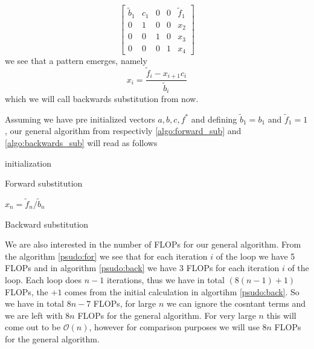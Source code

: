 \documentclass[10pt, a4paper]{amsart}
\begin{document}
\begin{equation}
\left[
  \begin{array}{cccc|c}
	\tilde{b}_1 & c_1 & 0 & 0 & \tilde{f}_1\\
	0 & 1 & 0 & 0 & x_2\\
	0 & 0 & 1 & 0 & x_3\\
	0 & 0 & 0 & 1 & x_4
  \end{array}
 \right]
\end{equation}
we see that a pattern emerges, namely
\begin{equation}\label{algo:backwards_sub}
	x_i = \frac{\tilde{f}_i - x_{i+1}c_i}{\tilde{b}_i}
\end{equation}
which we will call backwards substitution from now. 

Assuming we have pre initialized vectors $a, b, c, f^*$ and defining $\tilde{b}_1 = b_1$ and $\tilde{f}_1 = 1$, our general algorithm from respectivly \ref{algo:forward_sub} and \ref{algo:backwards_sub} will read as follows
\begin{algorithm}[H]\label{psudo:for}
\SetAlgoLined
 initialization\;
\caption{Forward substitution}
\end{algorithm}
\begin{algorithm}[H]\label{psudo:back}
\SetAlgoLined
 $x_n = \tilde{f}_n/\tilde{b}_n$\;
\caption{Backward substitution}
\end{algorithm}

We are also interested in the number of FLOPs for our general algorithm. From the algorithm \ref{psudo:for} we see that for each iteration $i$ of the loop we have 5 FLOPs and in algorithm \ref{psudo:back} we have 3 FLOPs for each iteration $i$ of the loop. Each loop does $n-1$ iterations, thus we have in total $(8(n-1) + 1)$ FLOPs, the $+1$ comes from the initial calculation in algortihm \ref{psudo:back}. So we have in total $8n-7$ FLOPs, for large $n$ we can ignore the cosntant terms and we are left with $8n$ FLOPs for the general algorithm. 
For very large $n$ this will come out to be $\mathcal{O}(n)$, however for comparison purposes we will use $8n$ FLOPs for the general algorithm. 
\end{document}
